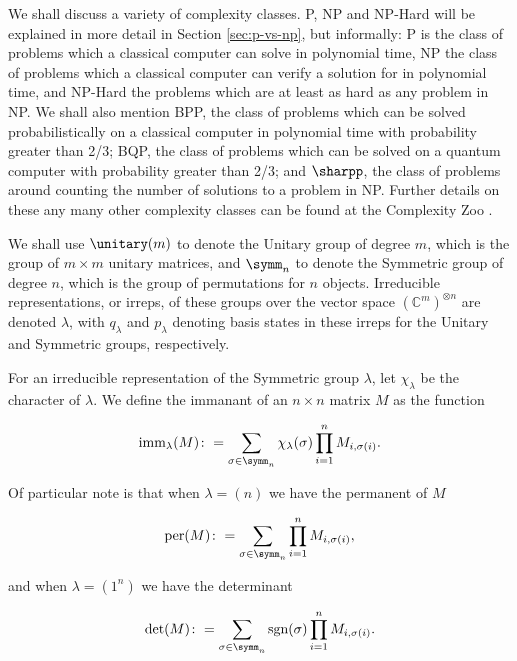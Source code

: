 We shall discuss a variety of complexity classes. P, NP and NP-Hard will be explained in more detail in Section \ref{sec:p-vs-np}, but informally: P is the class of problems which a classical computer can solve in polynomial time, NP the class of problems which a classical computer can verify a solution for in polynomial time, and NP-Hard the problems which are at least as hard as any problem in NP. We shall also mention BPP, the class of problems which can be solved probabilistically on a classical computer in polynomial time with probability greater than 2/3; BQP, the class of problems which can be solved on a quantum computer with probability greater than 2/3; and $\sharpp$, the class of problems around counting the number of solutions to a problem in NP. Further details on these any many other complexity classes can be found at the Complexity Zoo \cite{complexityzoo}.

We shall use $\unitary(m)$ to denote the Unitary group of degree $m$, which is the group of $m\times m$ unitary matrices, and $\symm_n$ to denote the Symmetric group of degree $n$, which is the group of permutations for $n$ objects. Irreducible representations, or irreps, of these groups over the vector space $(\mathbb{C}^m)^{\otimes n}$ are denoted $\lambda$, with $q_\lambda$ and $p_\lambda$ denoting basis states in these irreps for the Unitary and Symmetric groups, respectively.

For an irreducible representation of the Symmetric group $\lambda$, let $\chi_\lambda$ be the character of $\lambda$. We define the immanant of an $n\times n$ matrix $M$ as the function

\begin{equation}
\textrm{imm}_\lambda(M) \colon= \sum_{\sigma\in\symm_n}\chi_\lambda(\sigma)\prod_{i=1}^nM_{i,\sigma(i)}.
\end{equation}

Of particular note is that when $\lambda=(n)$ we have the permanent of $M$

\begin{equation}
\textrm{per}(M) \colon= \sum_{\sigma\in\symm_n}\prod_{i=1}^nM_{i,\sigma(i)},
\end{equation}

\noindent and when $\lambda=(1^n)$ we have the determinant

\begin{equation}
\textrm{det}(M) \colon= \sum_{\sigma\in\symm_n}\textrm{sgn}(\sigma)\prod_{i=1}^nM_{i,\sigma(i)}.
\end{equation}

